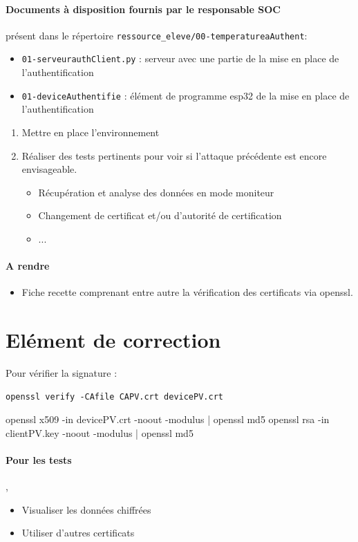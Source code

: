 \documentclass[french, 12pt]{article}%
\newcommand{\itemE}{\item[$\bullet$]}
\newif\ifPROF
\begin{document}
\paragraph{Documents à disposition fournis par le responsable SOC} présent  dans le répertoire \verb?ressource_eleve/00-temperatureaAuthent?: 
\begin{itemize}
\itemE \verb?01-serveurauthClient.py? : serveur avec une partie de la mise en place de l'authentification
\itemE \verb?01-deviceAuthentifie? : élément de programme esp32 de la mise en place de l'authentification
\end{itemize}


\begin{enumerate}
\item Mettre en place l'environnement 
\item Réaliser des tests pertinents pour voir si l'attaque précédente est encore envisageable. 
	\begin{itemize}
	\itemE Récupération et analyse des données en mode moniteur
	\itemE Changement de certificat et/ou d'autorité de certification
	\itemE ... 
	\end{itemize}
\end{enumerate}

\paragraph{A rendre}
\begin{itemize}
\itemE Fiche recette comprenant entre autre la vérification des certificats via openssl.
\end{itemize}


\ifPROF
\color{red}
\section{Elément de correction}


Pour vérifier la signature : 
\begin{lstlisting}[style=commande]
openssl verify -CAfile CAPV.crt devicePV.crt
\end{lstlisting}

openssl x509 -in devicePV.crt -noout -modulus | openssl md5
openssl rsa -in clientPV.key -noout -modulus | openssl md5


\paragraph{Pour les tests}, 
\begin{itemize}
\itemE Visualiser les données chiffrées 
\itemE Utiliser d'autres certificats
\end{itemize}
\end{document}
